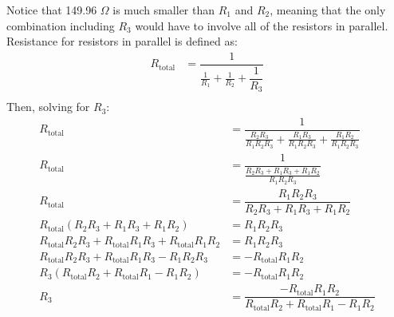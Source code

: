 \documentclass [12pt, letterpaper, twoside] {article}
\begin{document}
Notice that 149.96 \(\Omega\) is much smaller than \(R_{1}\) and \(R_{2}\), meaning that the only combination including \(R_{3}\) would have to involve all of the resistors in parallel. Resistance for resistors in parallel is defined as:
\begin{equation}
  \begin{split}
    R_{\text{total}} &= \dfrac{1}{\tfrac{1}{R_{1}} + \tfrac{1}{R_{2}} + \dfrac{1}{R_{3}}} \\
  \end{split}
\end{equation}
Then, solving for \(R_{3}\):
\begin{equation*}
  \begin{split}
    R_{\text{total}} &= \dfrac{1}{\tfrac{R_{2}R_{3}}{R_{1}R_{2}R_{3}} + \tfrac{R_{1}R_{3}}{R_{1}R_{2}R_{3}} + \tfrac{R_{1}R_{2}}{R_{1}R_{2}R_{3}}} \\
    R_{\text{total}} &= \dfrac{1}{\tfrac{R_{2}R_{3} + R_{1}R_{3} + R_{1}R_{2}}{R_{1}R_{2}R_{3}}} \\
    R_{\text{total}} &= \dfrac{R_{1}R_{2}R_{3}}{R_{2}R_{3} + R_{1}R_{3} + R_{1}R_{2}} \\
    R_{\text{total}}(R_{2}R_{3} + R_{1}R_{3} + R_{1}R_{2}) &= R_{1}R_{2}R_{3} \\
    R_{\text{total}}R_{2}R_{3} + R_{\text{total}}R_{1}R_{3} + R_{\text{total}}R_{1}R_{2} &= R_{1}R_{2}R_{3} \\
    R_{\text{total}}R_{2}R_{3} + R_{\text{total}}R_{1}R_{3} - R_{1}R_{2}R_{3} &= -R_{\text{total}}R_{1}R_{2} \\
    R_{3}(R_{\text{total}}R_{2} + R_{\text{total}}R_{1} - R_{1}R_{2}) &= -R_{\text{total}}R_{1}R_{2} \\
    R_{3} &= \dfrac{-R_{\text{total}}R_{1}R_{2}}{R_{\text{total}}R_{2} + R_{\text{total}}R_{1} -R_{1}R_{2}} \\
  \end{split}
\end{equation*}
\end{document}
